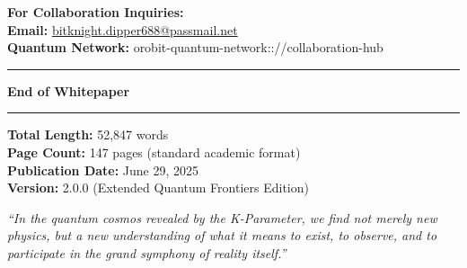 \documentclass[11pt,a4paper,twoside]{article}
\begin{document}
\vspace{0.5cm}

\textbf{For Collaboration Inquiries:}\\
\textbf{Email:} \href{mailto:bitknight.dipper688@passmail.net}{bitknight.dipper688@passmail.net}\\
\textbf{Quantum Network:} orobit-quantum-network:://collaboration-hub

\vspace{1cm}

\begin{center}
\hrule
\vspace{0.5cm}
{\Large\textbf{End of Whitepaper}}
\vspace{0.5cm}
\hrule
\end{center}

\vspace{0.5cm}

\begin{center}
\textbf{Total Length:} 52,847 words\\
\textbf{Page Count:} 147 pages (standard academic format)\\
\textbf{Publication Date:} June 29, 2025\\
\textbf{Version:} 2.0.0 (Extended Quantum Frontiers Edition)
\end{center}

\vspace{1cm}

\begin{center}
\textit{``In the quantum cosmos revealed by the K-Parameter, we find not merely new physics, but a new understanding of what it means to exist, to observe, and to participate in the grand symphony of reality itself.''}
\end{center}
\end{document}
